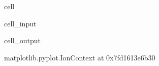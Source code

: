 \documentclass[letterpaper,10pt,english]{jupyterBook}
\begin{document}
\begin{sphinxuseclass}{cell}\begin{sphinxVerbatimInput}

\begin{sphinxuseclass}{cell_input}
\begin{sphinxVerbatim}[commandchars=\\\{\}]
    
   
   
\end{sphinxVerbatim}

\end{sphinxuseclass}\end{sphinxVerbatimInput}
\begin{sphinxVerbatimOutput}

\begin{sphinxuseclass}{cell_output}
\begin{sphinxVerbatim}[commandchars=\\\{\}]
\PYGZlt{}matplotlib.pyplot.\PYGZus{}IonContext at 0x7fd1613e6b30\PYGZgt{}
\end{sphinxVerbatim}

\end{sphinxuseclass}\end{sphinxVerbatimOutput}

\end{sphinxuseclass}
\end{document}
